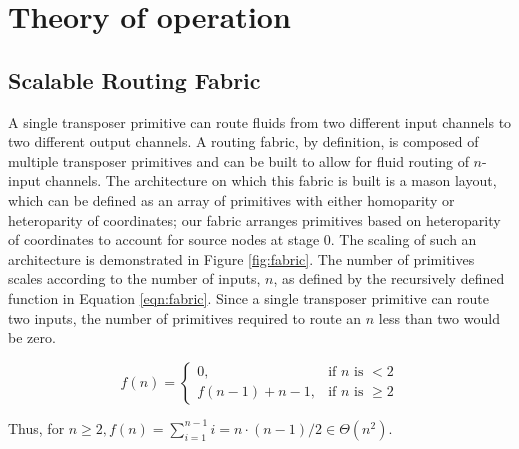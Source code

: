 \section{Theory of operation}
\subsection{Scalable Routing Fabric}
A single transposer primitive can route fluids from two different input channels to two different output channels. A routing fabric, by definition, is composed of multiple transposer primitives and can be built to allow for fluid routing of $n$-input channels. The architecture on which this fabric is built is a mason layout, which can be defined as an array of primitives with either homoparity or heteroparity of coordinates; our fabric arranges primitives based on heteroparity of coordinates to account for source nodes at stage 0. The scaling of such an architecture is demonstrated in Figure \ref{fig:fabric}. The number of primitives scales according to the number of inputs, $n$, as defined by the recursively defined function in Equation \ref{eqn:fabric}. Since a single transposer primitive can route two inputs, the number of primitives required to route an $n$ less than two would be zero.

\begin{equation}
  \label{eqn:fabric}
  f(n)= \begin{cases} 0, & \mbox{if } n\mbox{ is } <2 \\ f(n-1)+n-1, & \mbox{if } n\mbox{ is } \geq 2 \end{cases}
\end{equation}

Thus, for $n\geq 2, f(n) = \sum_{i=1}^{n-1} i = n \cdot (n-1) / 2 \in \Theta(n^2).$ 

